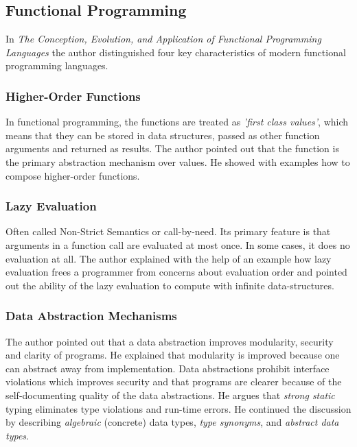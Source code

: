 \documentclass[12pt,twoside,a4paper]{report}
\begin{document}
\subsection{Functional Programming}\label{2.3.2}
In \textit{The Conception, Evolution, and Application of Functional Programming Languages}\cite{12} the author distinguished four key characteristics of modern functional programming languages.

\subsubsection{Higher-Order Functions}
In functional programming, the functions are treated as \textit{'first class values'}, which means that they can be stored in data structures, passed as other function arguments and returned as results. The author pointed out that the function is the primary abstraction mechanism over values. He showed with examples how to compose higher-order functions.

\subsubsection{Lazy Evaluation}
Often called Non-Strict Semantics or call-by-need. Its primary feature is that arguments in a function call are evaluated at most once. In some cases, it does no evaluation at all. The author
explained with the help of an example how lazy evaluation frees a programmer from concerns about evaluation order and pointed out the ability of the lazy evaluation to compute with infinite
data-structures.

\subsubsection{Data Abstraction Mechanisms}
The author pointed out that a data abstraction improves modularity, security and clarity of programs. He explained that modularity is improved because one can abstract away from
implementation. Data abstractions prohibit interface violations which improves security and that programs are clearer because of the self-documenting quality of the data abstractions. He argues
that \textit{strong static} typing eliminates type violations and run-time errors. He continued the discussion by describing \textit{algebraic} (concrete) data types, \textit{type synonyms}, and \textit{abstract data types}.
\end{document}
